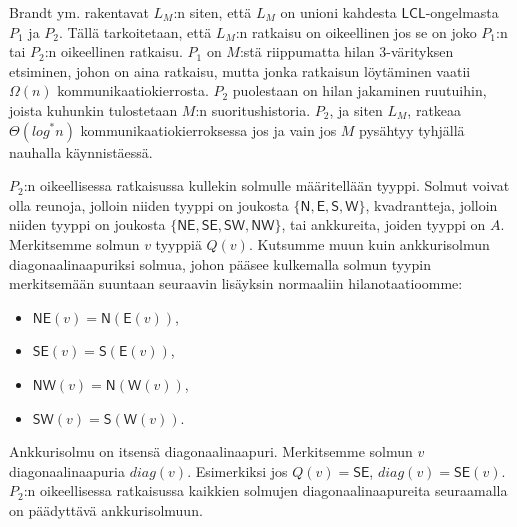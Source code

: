 \documentclass[12pt,finnish]{tktltiki2}
\theoremstyle{definition}
\theoremstyle{remark}
\newcommand*{\lcl}{\ensuremath{\mathsf{LCL}}}
\begin{document}

Brandt ym. rakentavat $L_M$:n siten, että $L_M$ on unioni kahdesta \lcl -ongelmasta $P_1$ ja $P_2$. Tällä tarkoitetaan, että $L_M$:n ratkaisu on oikeellinen jos se on joko $P_1$:n tai $P_2$:n oikeellinen ratkaisu. $P_1$ on $M$:stä riippumatta hilan 3-värityksen etsiminen, johon on aina ratkaisu, mutta jonka ratkaisun löytäminen vaatii $\Omega(n)$ kommunikaatiokierrosta. $P_2$ puolestaan on hilan jakaminen ruutuihin, joista kuhunkin tulostetaan $M$:n suoritushistoria. $P_2$, ja siten $L_M$, ratkeaa $\Theta(log^* n)$ kommunikaatiokierroksessa jos ja vain jos $M$ pysähtyy tyhjällä nauhalla käynnistäessä.

$P_2$:n oikeellisessa ratkaisussa kullekin solmulle määritellään tyyppi. Solmut voivat olla reunoja, jolloin niiden tyyppi on joukosta $\{\mathsf{N, E, S, W}\}$, kvadrantteja, jolloin niiden tyyppi on joukosta $\{\mathsf{NE, SE, SW, NW}\}$, tai ankkureita, joiden tyyppi on $A$. Merkitsemme solmun $v$ tyyppiä $Q(v)$. Kutsumme muun kuin ankkurisolmun diagonaalinaapuriksi solmua, johon pääsee kulkemalla solmun tyypin merkitsemään suuntaan seuraavin lisäyksin normaaliin hilanotaatioomme:
\begin{itemize}[label={}]
  \item $\mathsf{NE}(v) = \mathsf{N}(\mathsf{E}(v))$,
  \item $\mathsf{SE}(v) = \mathsf{S}(\mathsf{E}(v))$,
  \item $\mathsf{NW}(v) = \mathsf{N}(\mathsf{W}(v))$,
  \item $\mathsf{SW}(v) = \mathsf{S}(\mathsf{W}(v))$.
\end{itemize}
Ankkurisolmu on itsensä diagonaalinaapuri. Merkitsemme solmun $v$ diagonaalinaapuria $diag(v)$. Esimerkiksi jos $Q(v) = \mathsf{SE}$, $diag(v) = \mathsf{SE}(v)$. $P_2$:n oikeellisessa ratkaisussa kaikkien solmujen diagonaalinaapureita seuraamalla on päädyttävä ankkurisolmuun.
\end{document}
